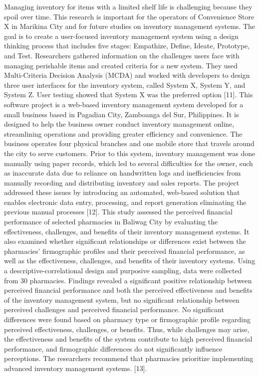 \documentclass[12pt, letterpaper]{article}
\begin{document}
\hspace*{2em}Managing inventory for items with a limited shelf life is challenging because they spoil over time. This research is important for the operators of Convenience Store X in Marikina City and for future studies on inventory management systems. The goal is to create a user-focused inventory management system using a design thinking process that includes five stages: Empathize, Define, Ideate, Prototype, and Test. Researchers gathered information on the challenges users face with managing perishable items and created criteria for a new system. They used Multi-Criteria Decision Analysis (MCDA) and worked with developers to design three user interfaces for the inventory system, called System X, System Y, and System Z. User testing showed that System X was the preferred option [11].
\hspace*{2em}This software project is a web-based inventory management system developed for a small business based in Pagadian City, Zamboanga del Sur, Philippines. It is designed to help the business owner conduct inventory management online, streamlining operations and providing greater efficiency and convenience. The business operates four physical branches and one mobile store that travels around the city to serve customers. Prior to this system, inventory management was done manually using paper records, which led to several difficulties for the owner, such as inaccurate data due to reliance on handwritten logs and inefficiencies from manually recording and distributing inventory and sales reports. The project addressed these issues by introducing an automated, web-based solution that enables electronic data entry, processing, and report generation eliminating the previous manual processes [12]. 
\hspace*{2em}This study assessed the perceived financial performance of selected pharmacies in Baliwag City by evaluating the effectiveness, challenges, and benefits of their inventory management systems. It also examined whether significant relationships or differences exist between the pharmacies’ firmographic profiles and their perceived financial performance, as well as the effectiveness, challenges, and benefits of their inventory systems. Using a descriptive‑correlational design and purposive sampling, data were collected from 30 pharmacies. Findings revealed a significant positive relationship between perceived financial performance and both the perceived effectiveness and benefits of the inventory management system, but no significant relationship between perceived challenges and perceived financial performance. No significant differences were found based on pharmacy type or firmographic profile regarding perceived effectiveness, challenges, or benefits. Thus, while challenges may arise, the effectiveness and benefits of the system contribute to high perceived financial performance, and firmographic differences do not significantly influence perceptions. The researchers recommend that pharmacies prioritize implementing advanced inventory management systems. [13].
\end{document}
